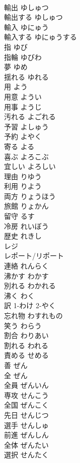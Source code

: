 \documentclass[8pt]{extreport}
\begin{document}
\begin{CJK}{UTF8}{min}
\\	輸出	ゆしゅつ	
\\	輸出する	ゆしゅつ	
\\	輸入	ゆにゅう	
\\	輸入する	ゆにゅうする	
\\	指	ゆび	
\\	指輪	ゆびわ	
\\	夢	ゆめ	
\\	揺れる	ゆれる	
\\	用	よう	
\\	用意	ようい	
\\	用事	ようじ	
\\	汚れる	よごれる	
\\	予習	よしゅう	
\\	予約	よやく	
\\	寄る	よる	
\\	喜ぶ	よろこぶ	
\\	宜しい	よろしい	
\\	理由	りゆう	
\\	利用	りよう	
\\	両方	りょうほう	
\\	旅館	りょかん	
\\	留守	るす	
\\	冷房	れいぼう	
\\	歴史	れきし	
\\	レジ		
\\	レポート/リポート		
\\	連絡	れんらく	
\\	沸かす	わかす	
\\	別れる	わかれる	
\\	沸く	わく	
\\	訳	1-わけ 2-やく	
\\	忘れ物	わすれもの	
\\	笑う	わらう	
\\	割合	わりあい	
\\	割れる	われる	
\\	責める	せめる	
\\	善	ぜん	
\\	全	ぜん	
\\	全員	ぜんいん	
\\	専攻	せんこう	
\\	全国	ぜんこく	
\\	先日	せんじつ	
\\	選手	せんしゅ	
\\	前進	ぜんしん	
\\	全体	ぜんたい	
\\	選択	せんたく	

\end{CJK}
\end{document}
